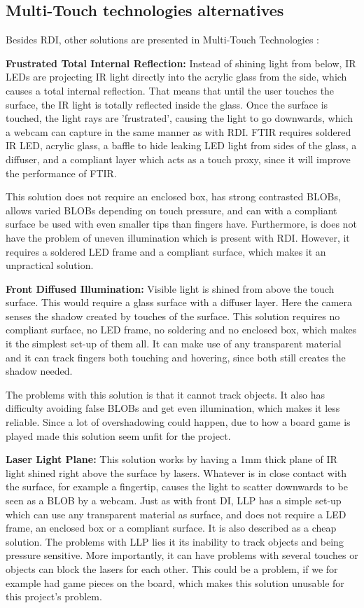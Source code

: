 \subsection{Multi-Touch technologies alternatives}\label{technologiesAlternatives}
Besides RDI, other solutions are presented in Multi-Touch Technologies \citep{multiTT}:

\textbf{Frustrated Total Internal Reflection:} Instead of shining light from below, IR LEDs are projecting IR light directly into the acrylic glass from the side, which causes a total internal reflection. That means that until the user touches the surface, the IR light is totally reflected inside the glass. Once the surface is touched, the light rays are 'frustrated', causing the light to go downwards, which a webcam can capture in the same manner as with RDI. FTIR requires soldered IR LED, acrylic glass, a baffle to hide leaking LED light from sides of the glass, a diffuser, and a compliant layer which acts as a touch proxy, since it will improve the performance of FTIR.

This solution does not require an enclosed box, has strong contrasted BLOBs, allows varied BLOBs depending on touch pressure, and can with a compliant surface be used with even smaller tips than fingers have. Furthermore, is does not have the problem of uneven illumination which is present with RDI. However, it requires a soldered LED frame and a compliant surface, which makes it an unpractical solution.

\textbf{Front Diffused Illumination:} Visible light is shined from above the touch surface. This would require a glass surface with a diffuser layer. Here the camera senses the shadow created by touches of the surface. This solution requires no compliant surface, no LED frame, no soldering and no enclosed box, which makes it the simplest set-up of them all. It can make use of any transparent material and it can track fingers both touching and hovering, since both still creates the shadow needed.

The problems with this solution is that  it cannot track objects. It also has difficulty avoiding false BLOBs and get even illumination, which makes it less reliable. Since a lot of overshadowing could happen, due to how a board game is played made this solution seem unfit for the project. 

\textbf{Laser Light Plane:} This solution works by having a 1mm thick plane of IR light shined right above the surface by lasers. Whatever is in close contact with the surface, for example a fingertip, causes the light to scatter downwards to be seen as a BLOB by a webcam. Just as with front DI, LLP has a simple set-up which can use any transparent material as surface, and does not require a LED frame, an enclosed box or a compliant surface. It is also described as a cheap solution. The problems with LLP lies it its inability to track objects and being pressure sensitive. More importantly, it can have problems with several touches or objects can block the lasers for each other. This could be a problem, if we for example had game pieces on the board, which makes this solution unusable for this project's problem. 

